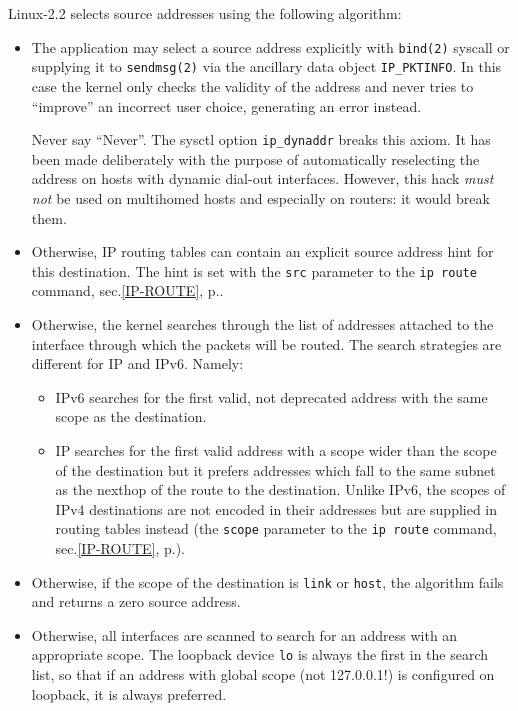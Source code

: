 Linux-2.2 selects source addresses using the following algorithm:

\begin{itemize}
\item
The application may select a source address explicitly with \verb|bind(2)|
syscall or supplying it to \verb|sendmsg(2)| via the ancillary data object
\verb|IP_PKTINFO|. In this case the kernel only checks the validity
of the address and never tries to ``improve'' an incorrect user choice,
generating an error instead.
\begin{NB}
 Never say ``Never''. The sysctl option \verb|ip_dynaddr| breaks
 this axiom. It has been made deliberately with the purpose
 of automatically reselecting the address on hosts with dynamic dial-out interfaces.
 However, this hack {\em must not\/} be used on multihomed hosts
 and especially on routers: it would break them.
\end{NB}


\item Otherwise, IP routing tables can contain an explicit source
address hint for this destination. The hint is set with the \verb|src| parameter
to the \verb|ip route| command, sec.\ref{IP-ROUTE}, p.\pageref{IP-ROUTE}.


\item Otherwise, the kernel searches through the list of addresses
attached to the interface through which the packets will be routed.
The search strategies are different for IP and IPv6. Namely:

\begin{itemize}
\item IPv6 searches for the first valid, not deprecated address
with the same scope as the destination.

\item IP searches for the first valid address with a scope wider
than the scope of the destination but it prefers addresses
which fall to the same subnet as the nexthop of the route
to the destination. Unlike IPv6, the scopes of IPv4 destinations
are not encoded in their addresses but are supplied
in routing tables instead (the \verb|scope| parameter to the \verb|ip route| command,
sec.\ref{IP-ROUTE}, p.\pageref{IP-ROUTE}).

\end{itemize}


\item Otherwise, if the scope of the destination is \verb|link| or \verb|host|,
the algorithm fails and returns a zero source address.

\item Otherwise, all interfaces are scanned to search for an address
with an appropriate scope. The loopback device \verb|lo| is always the first
in the search list, so that if an address with global scope (not 127.0.0.1!)
is configured on loopback, it is always preferred.

\end{itemize}


